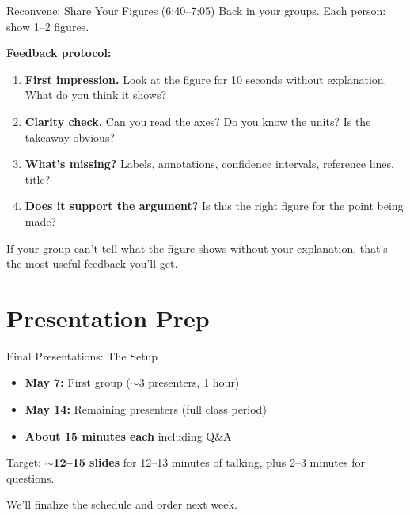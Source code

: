 \begin{frame}{Reconvene: Share Your Figures (6:40--7:05)}
  Back in your groups. Each person: show 1--2 figures.

  \vspace{8pt}

  \textbf{Feedback protocol:}

  \vspace{4pt}

  \begin{enumerate}
    \item \textbf{First impression.} Look at the figure for 10 seconds without explanation. What do you think it shows?

    \vspace{2pt}

    \item \textbf{Clarity check.} Can you read the axes? Do you know the units? Is the takeaway obvious?

    \vspace{2pt}

    \item \textbf{What's missing?} Labels, annotations, confidence intervals, reference lines, title?

    \vspace{2pt}

    \item \textbf{Does it support the argument?} Is this the right figure for the point being made?
  \end{enumerate}

  \vspace{8pt}

  If your group can't tell what the figure shows without your explanation, that's the most useful feedback you'll get.
\end{frame}

\section{Presentation Prep}

\begin{frame}{Final Presentations: The Setup}
  \begin{itemize}
    \item \textbf{May 7:} First group ($\sim$3 presenters, 1 hour)
    \item \textbf{May 14:} Remaining presenters (full class period)
    \item \textbf{About 15 minutes each} including Q\&A
  \end{itemize}

  \vspace{8pt}

  Target: \textbf{$\sim$12--15 slides} for 12--13 minutes of talking, plus 2--3 minutes for questions.

  \vspace{8pt}

  We'll finalize the schedule and order next week.
\end{frame}

